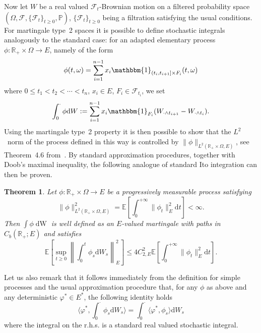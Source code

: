 \documentclass[10pt]{article}
\newcommand{\mathd}{\mathrm{d}}
\newcommand{\tmop}[1]{\ensuremath{\operatorname{#1}}}
\newtheorem{theorem}{Theorem}
\begin{document}
Now let $W$ be a real valued $\mathcal{F}_t$\mbox{-}Brownian motion on a
filtered probability space $(\Omega, \mathcal{F}, \{ \mathcal{F}_t \}_{t
\geqslant 0}, \mathbb{P})$, $\{ \mathcal{F}_t \}_{t \geqslant 0}$ being a
filtration satisfying the usual conditions. For martingale type~2 spaces it is
possible to define stochastic integrals analogously to the standard case: for
an adapted elementary process $\phi : \mathbb{R}_+ \times \Omega \rightarrow
E$, namely of the form
\[ \phi (t, \omega) = \sum_{i = 1}^{n - 1} x_i  \mathbbm{1}_{(t_i, t_{i + 1}]
   \times F_i} (t, \omega) \]
where $0 \leqslant t_1 < t_2 < \cdots < t_n$, $x_i \in E$, $F_i \in
\mathcal{F}_{t_i}$, we set
\[ \int_0^{\cdot} \phi \mathd W : = \sum_{i = 1}^{n - 1} x_i 
   \mathbbm{1}_{F_i} (W_{\cdot \wedge t_{i + 1}} - W_{\cdot \wedge t_i}) . \]
Using the martingale type~2 property it is then possible to show that the
$L^2$~norm of the process defined in this way is controlled by $\| \phi
\|_{L^2 (\mathbb{R}_+ \times \Omega, E)}$, see Theorem~4.6
from~{\cite{vanneerven2015}}. By standard approximation procedures, together
with Doob's maximal inequality, the following analogue of standard Ito
integration can then be proven.

\begin{theorem}
  \label{apendixA3 thm stoch integral}Let $\phi : \mathbb{R}_+ \times \Omega
  \rightarrow E$ be a progressively measurable process satisfying
  \[ \| \phi \|_{L^2 (\mathbb{R}_+ \times \Omega, E)}^2 =\mathbb{E} \left[
     \int_0^{+ \infty} \| \phi_t \|_E^2 \mathd t \right] < \infty . \]
  Then $\int \phi \tmop{dW}$ is well defined as an $E$\mbox{-}valued
  martingale with paths in $C_b (\mathbb{R}_+ ; E)$ and satisfies
  \begin{equation}
    \mathbb{E} \left[ \sup_{t \geqslant 0} \left\| \int_0^t \phi_s \mathd W_s
    \right\|_E^2 \right] \leqslant 4 C_{2, E}^2 \mathbb{E} \left[ \int_0^{+
    \infty} \| \phi_t \|_E^2 \mathd t \right] . \label{appendixA3 ito}
  \end{equation}
\end{theorem}

Let us also remark that it follows immediately from the definition for simple
processes and the usual approximation procedure that, for any $\phi$ as above
and any deterministic $\varphi^{\ast} \in E^{\ast}$, the following identity
holds
\begin{equation}
  \langle \varphi^{\ast}, \int_0^{\cdot} \phi_s \mathd W_s \rangle =
  \int_0^{\cdot} \langle \varphi^{\ast}, \phi_s \rangle \mathd W_s
  \label{appendixA3 identity dual}
\end{equation}
where the integral on the r.h.s. is a standard real valued stochastic
integral.
\end{document}
